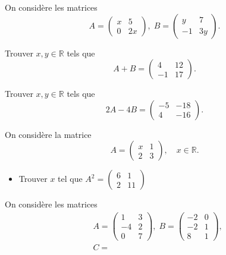 \documentclass[12pt,a4paper]{book}
\begin{document}
\begin{multicols*}{2}
	\begin{Exercice}
		On considère les matrices
		\[ 
		A=\begin{pmatrix}
		x & 5 \\
		0 & 2x  
		\end{pmatrix},\;B=\begin{pmatrix}
		y & 7 \\
		-1 & 3y  
		\end{pmatrix}.
		\] 
		\begin{listexos}
			\item  Trouver $x,y\in\mathbb{R}$ tels que
			\[ 
			A+B=\begin{pmatrix}
			4 & 12 \\
			-1 & 17  
			\end{pmatrix}.
			\]
			\item Trouver $x,y\in\mathbb{R}$ tels que
			\[ 
			2A-4B=\begin{pmatrix}
			-5 & -18 \\
			4 & -16  
			\end{pmatrix}.
			\]
		\end{listexos}
	\end{Exercice}  
	\begin{Exercice}
		On considère la matrice
		\[ 
		A=
		\begin{pmatrix}
		x & 1 \\
		2 & 3  
		\end{pmatrix},\quad x\in\mathbb{R}.
		\]
		\begin{itemize}
			\item Trouver $x$ tel que $A^2=\begin{pmatrix}
			6 & 1 \\
			2 & 11  
			\end{pmatrix}$ 
		\end{itemize}
	\end{Exercice}  
	\begin{Exercice}
		On considère les matrices 
		\[ 
		\begin{aligned}
		&A=
		\begin{pmatrix}
		1 & 3 \\
		-4 & 2 \\
		0 & 7 
		\end{pmatrix},
		\;
		B=
		\begin{pmatrix}
		-2 & 0 \\
		-2 & 1 \\
		8 & 1 
		\end{pmatrix},
		\\
		&C=

\end{aligned}\]
\end{Exercice}
\end{multicols*}
\end{document}
